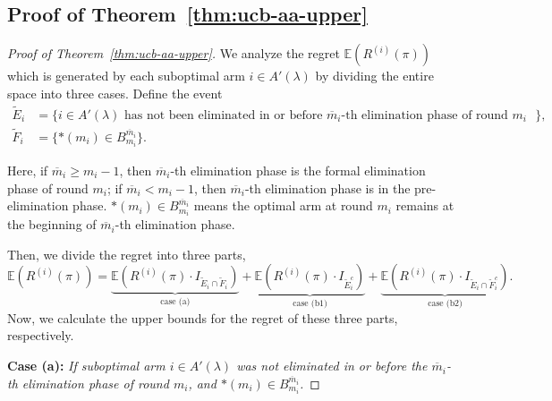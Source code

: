\documentclass[
  12pt]{article}
\begin{document}
\subsection{Proof of Theorem~\ref{thm:ucb-aa-upper}}
\label{sec:Proof of thm:ucb-aa-upper}
\begin{proof}[Proof of Theorem~\ref{thm:ucb-aa-upper}]
 We analyze the regret $\mathbb{E}(R^{(i)}(\pi)) $ which is generated by each suboptimal arm $i\in A'(\lambda)$ by dividing the entire space into three cases. Define the event 
\begin{align*}
    \tilde{E}_i&=\{ i\in A'(\lambda) \text{ has not been eliminated in or before $\overline{m}_i$-th elimination phase of round $m_i$ }  \}, \\
    \tilde{F}_i&=\{ *(m_i) \in B_{m_i}^{\overline{m}_i} \}.
\end{align*}

Here, if $\overline{m}_i\geq m_i-1$, then $\overline{m}_i$-th elimination phase is the formal elimination phase of round $m_i$; if $\overline{m}_i< m_i-1$, then $\overline{m}_i$-th elimination phase is in the pre-elimination phase. $*(m_i)\in B_{m_i}^{\overline{m}_i}$ means the optimal arm at round $m_i$ remains at the beginning of $\overline{m}_i$-th elimination phase.

Then, we divide the regret into three parts, 
\[\mathbb{E}(R^{(i)}(\pi)) = \underbrace{\mathbb{E}\left(R^{(i)}(\pi)\cdot I_{\tilde{E}_i\cap \tilde{F}_i}\right)}_{\text{case (a)}} + \underbrace{\mathbb{E}\left(R^{(i)}(\pi)\cdot I_{\tilde{E}_i^c}\right)}_{\text{case (b1)}} + \underbrace{\mathbb{E}\left(R^{(i)}(\pi)\cdot I_{\tilde{E}_i\cap\tilde{F}_i^c}\right)}_{\text{case (b2)}}.\]
Now, we calculate the upper bounds for the regret of these three parts, respectively.

\textbf{Case (a):} \textit{ If suboptimal arm $i\in A'(\lambda)$ was not eliminated in or before the $\overline{m}_i$-th elimination phase of round $m_i$, and $*(m_i)\in B_{m_i}^{\overline{m}_i}$. }


\end{proof}
\end{document}
